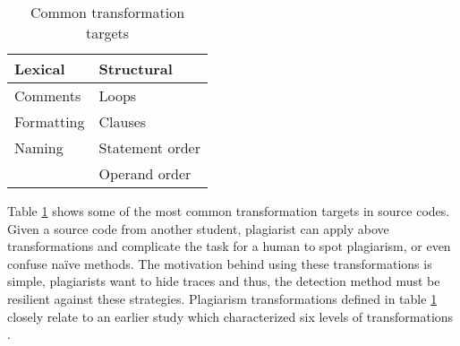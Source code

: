 \begin{table}[ht]
\centering
\caption{Common transformation targets}
\label{tbl-plag-strat}
\begin{tabular}{|l|l|} \hline
 \textbf{Lexical} & \textbf{Structural} \\ \hline
 Comments                    & Loops                          \\
 Formatting                  & Clauses                        \\
 Naming                      & Statement order                \\
                             & Operand order               \\ \hline
\end{tabular}
\end{table}

\noindent
Table \ref{tbl-plag-strat} shows some of the most common transformation targets in source codes. Given a source code from another student, plagiarist can apply above transformations and complicate the task for a human to spot plagiarism, or even confuse naïve methods. The motivation behind using these transformations is simple, plagiarists want to hide traces and thus, the detection method must be resilient against these strategies. Plagiarism transformations defined in table \ref{tbl-plag-strat} closely relate to an earlier study which characterized six levels of transformations \cite{Faidhi:1987:EAD:27319.27321}.

\begin{table}[ht]
\centering
\caption{Transformation levels}
\label{tbl-plag-transf}
\end{table}

